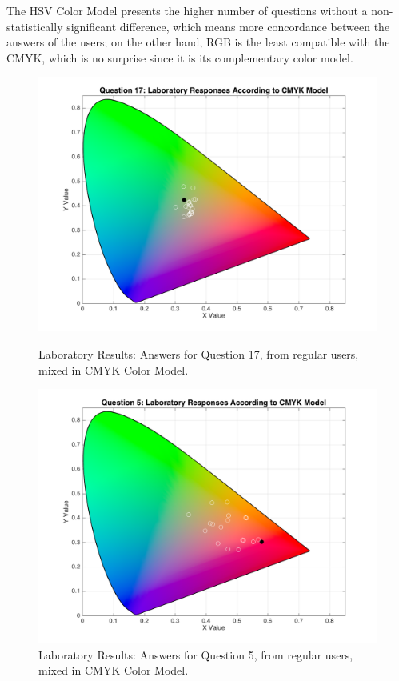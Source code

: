 %
The HSV Color Model presents the higher number of questions without a non-statistically significant difference, which means more concordance between the answers of the users; on the other hand, RGB is the least compatible with the CMYK, which is no surprise
since it is its complementary color model. \par
%
\begin{figure}[htbp]
  \centering
  \begin{minipage}{0.48\textwidth}
    \centering
    \includegraphics[width=\textwidth]{images/17_lab_CMYKresponses.png}
    \caption[Laboratory Results: Answers for Question 17, from regular users, mixed in CMYK Color Model.]{Laboratory Results: Answers for Question 17, from regular users, mixed in CMYK Color Model.}
    \label{fig:labcmykregular_17}
  \end{minipage}\hfill
  \begin{minipage}{0.48\textwidth}
    \centering
    \includegraphics[width=\textwidth]{images/5_lab_CMYKresponses.png}
    \caption[Laboratory Results: Answers for Question 5, from regular users, mixed in CMYK Color Model.]{Laboratory Results: Answers for Question 5, from regular users, mixed in CMYK Color Model.}
    \label{fig:labcmykregular_5}
  \end{minipage}
\end{figure}
